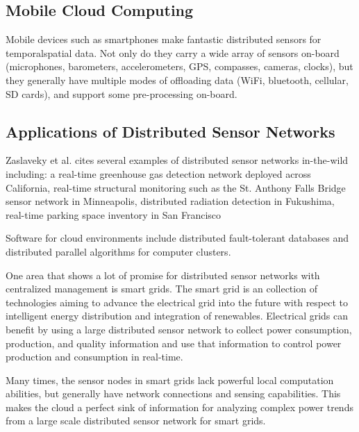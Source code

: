 \documentclass[twocolumn]{article}
\begin{document}

\subsection{Mobile Cloud Computing}
Mobile devices such as smartphones make fantastic distributed sensors for temporalspatial data. Not only do they carry a wide array of sensors on-board (microphones, barometers, accelerometers, GPS, compasses, cameras, clocks), but they generally have multiple modes of offloading data (WiFi, bluetooth, cellular, SD cards), and support some pre-processing on-board.

\subsection{Applications of Distributed Sensor Networks}
Zaslaveky et al. \cite{zaslavsky_sensing_2013} cites several examples of distributed sensor networks in-the-wild including: a real-time greenhouse gas detection network deployed across California, real-time structural monitoring such as the St. Anthony Falls Bridge sensor network in Minneapolis, distributed radiation detection in Fukushima, real-time parking space inventory in San Francisco

Software for cloud environments include distributed fault-tolerant databases and distributed parallel algorithms for computer clusters. 

One area that shows a lot of promise for distributed sensor networks with centralized management is smart grids. The smart grid is an collection of technologies aiming to advance the electrical grid into the future with respect to intelligent energy distribution and integration of renewables. Electrical grids can benefit by using a large distributed sensor network to collect power consumption, production, and quality information and use that information to control power production and consumption in real-time. 

Many times, the sensor nodes in smart grids lack powerful local computation abilities, but generally have network connections and sensing capabilities. This makes the cloud a perfect sink of information for analyzing complex power trends from a large scale distributed sensor network for smart grids\cite{botta_integration_2016}.
\end{document}
